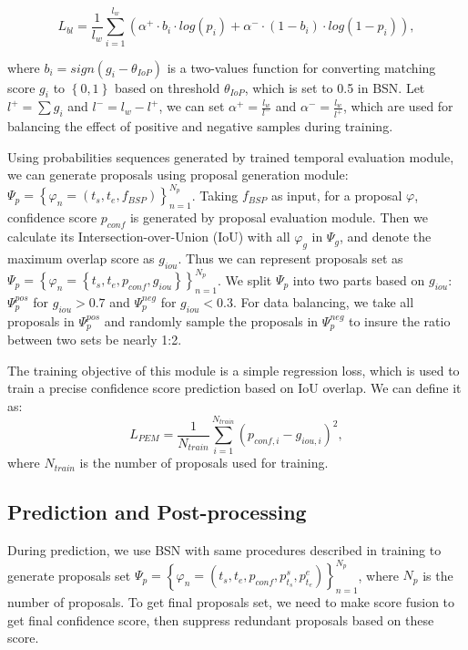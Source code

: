 \documentclass[runningheads]{llncs}
\begin{document}
\begin{small}
\begin{equation}
L_{bl}=\frac{1}{l_w}\sum_{i=1}^{l_w} \left (\alpha^{+} \cdot b_i \cdot  log(p_i)+\alpha^{-} \cdot (1-b_i) \cdot log(1-p_i) \right ),
\end{equation}
\end{small}
where $b_i=sign(g_i-\theta_{IoP})$ is a two-values function for converting matching score $g_i$ to $\left \{0,1  \right \}$ based on threshold $\theta_{IoP}$, which is set to 0.5 in BSN.  Let $l^+=\sum g_i$ and $l^-=l_w-l^+$, we can set $\alpha^+=\frac{l_w}{l^-}$ and $\alpha^-=\frac{l_w}{l^+}$, which are used for balancing the effect of positive and negative samples during training.


Using probabilities sequences generated by trained temporal evaluation module, we can generate proposals using proposal generation module: $\Psi_p  = \left \{ \varphi _n=(t_s,t_e,f_{BSP}) \right \}_{n=1}^{N_p}$. Taking $f_{BSP}$ as input, for a proposal $\varphi$,  confidence score $p_{conf}$ is generated by proposal evaluation module. Then we calculate its Intersection-over-Union (IoU)  with all $\varphi_g$ in $\Psi_g$, and denote the maximum overlap score as $g_{iou}$. Thus we can represent proposals set as $\Psi_p  = \left \{ \varphi _n =\left \{t_s,t_e,p_{conf},g_{iou}   \right \} \right \}_{n=1}^{N_p}$.
%
We split $\Psi_p$ into two parts based on $g_{iou}$: $\Psi_p^{pos}$ for $g_{iou}>0.7$ and  $\Psi_p^{neg}$ for $g_{iou}<0.3$. For data balancing, we take all proposals in $\Psi_p^{pos}$ and randomly sample the proposals in $\Psi_p^{neg}$ to insure the ratio between two sets be nearly 1:2.

The training objective of this module is a simple regression loss, which is used to train a precise confidence score prediction based on IoU overlap. We can define it as:
\begin{equation}
L_{PEM}=\frac{1}{N_{train}} \sum_{i=1}^{N_{train}}(p_{conf,i}-g_{iou,i})^2 ,
\end{equation}
where $N_{train}$ is the number of proposals used for training.

\subsection{Prediction and Post-processing}


During prediction, we use BSN with same procedures described in training to generate proposals set $\Psi_p  = \left \{  \varphi  _n=(t_s, t_e, p_{conf}, p^s_{t_s} ,  p^e_{t_e}  ) \right \}_{n=1}^{N_p}$, where   $N_p$ is the number of proposals.
To get final proposals set, we need to make score fusion to get final confidence score, then suppress redundant proposals based on these score.
\end{document}
